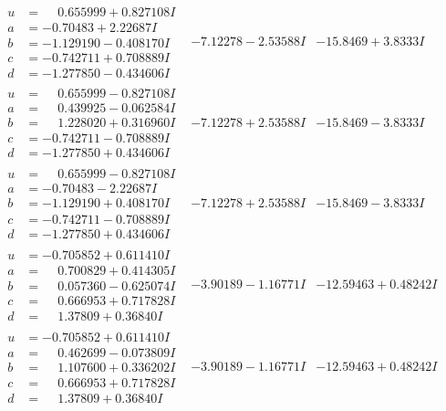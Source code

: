\documentclass[1p]{elsarticle_modified}
\theoremstyle{definition}
\begin{document}
$$\begin{array}{c|c|c}
\begin{aligned}
u &= \phantom{-}0.655999 + 0.827108 I \\
a &= -0.70483 + 2.22687 I \\
b &= -1.129190 - 0.408170 I \\
c &= -0.742711 + 0.708889 I \\
d &= -1.277850 - 0.434606 I\end{aligned}
 & -7.12278 - 2.53588 I & -15.8469 + 3.8333 I \\ \hline\begin{aligned}
u &= \phantom{-}0.655999 - 0.827108 I \\
a &= \phantom{-}0.439925 - 0.062584 I \\
b &= \phantom{-}1.228020 + 0.316960 I \\
c &= -0.742711 - 0.708889 I \\
d &= -1.277850 + 0.434606 I\end{aligned}
 & -7.12278 + 2.53588 I & -15.8469 - 3.8333 I \\ \hline\begin{aligned}
u &= \phantom{-}0.655999 - 0.827108 I \\
a &= -0.70483 - 2.22687 I \\
b &= -1.129190 + 0.408170 I \\
c &= -0.742711 - 0.708889 I \\
d &= -1.277850 + 0.434606 I\end{aligned}
 & -7.12278 + 2.53588 I & -15.8469 - 3.8333 I \\ \hline\begin{aligned}
u &= -0.705852 + 0.611410 I \\
a &= \phantom{-}0.700829 + 0.414305 I \\
b &= \phantom{-}0.057360 - 0.625074 I \\
c &= \phantom{-}0.666953 + 0.717828 I \\
d &= \phantom{-}1.37809 + 0.36840 I\end{aligned}
 & -3.90189 - 1.16771 I & -12.59463 + 0.48242 I \\ \hline\begin{aligned}
u &= -0.705852 + 0.611410 I \\
a &= \phantom{-}0.462699 - 0.073809 I \\
b &= \phantom{-}1.107600 + 0.336202 I \\
c &= \phantom{-}0.666953 + 0.717828 I \\
d &= \phantom{-}1.37809 + 0.36840 I\end{aligned}
 & -3.90189 - 1.16771 I & -12.59463 + 0.48242 I\\

\end{array}$$
\end{document}
